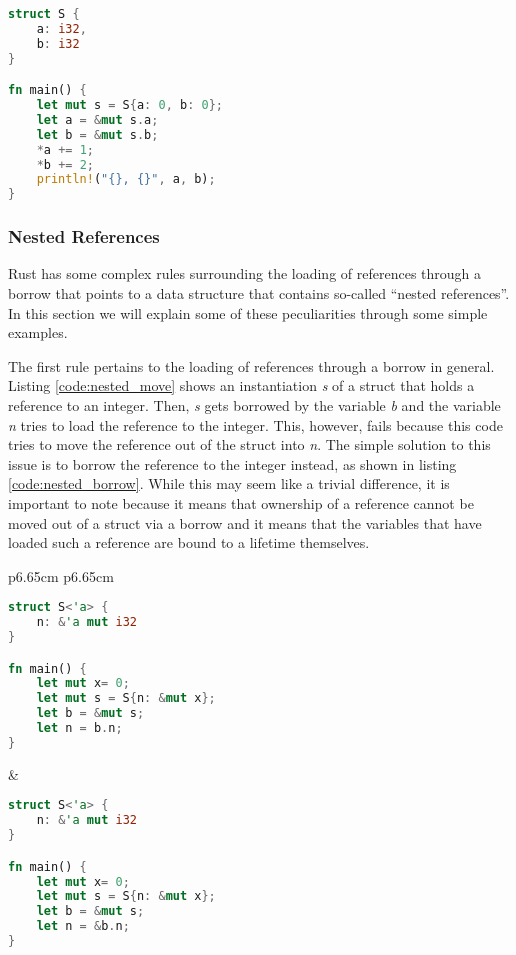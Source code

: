 \begin{lstlisting}[language=Rust,frame=single,caption=Borrowing struct fields,label=code:struct_semantics]
struct S {
    a: i32,
    b: i32
}

fn main() {
    let mut s = S{a: 0, b: 0};
    let a = &mut s.a;
    let b = &mut s.b;
    *a += 1;
    *b += 2;
    println!("{}, {}", a, b);
}
\end{lstlisting}

\subsubsection{Nested References}
Rust has some complex rules surrounding the loading of references through a borrow that points to a data structure that contains so-called ``nested references''.
In this section we will explain some of these peculiarities through some simple examples.

The first rule pertains to the loading of references through a borrow in general.
Listing \ref{code:nested_move} shows an instantiation \textit{s} of a struct that holds a reference to an integer.
Then, \textit{s} gets borrowed by the variable \textit{b} and the variable \textit{n} tries to load the reference to the integer.
This, however, fails because this code tries to move the reference out of the struct into \textit{n}.
The simple solution to this issue is to borrow the reference to the integer instead, as shown in listing \ref{code:nested_borrow}.
While this may seem like a trivial difference, it is important to note because it means that ownership of a reference cannot be moved out of a struct via a borrow and it means that the variables that have loaded such a reference are bound to a lifetime themselves.
\begin{tabular}{p{6.65cm} p{6.65cm}}
    \begin{lstlisting}[language=Rust,frame=single,caption=Move reference,label=code:nested_move]
struct S<'a> {
    n: &'a mut i32
}

fn main() {
    let mut x= 0;
    let mut s = S{n: &mut x};
    let b = &mut s;
    let n = b.n;
}
    \end{lstlisting}

    &

    \begin{lstlisting}[language=Rust,frame=single,caption=Borrow reference,label=code:nested_borrow]
struct S<'a> {
    n: &'a mut i32
}

fn main() {
    let mut x= 0;
    let mut s = S{n: &mut x};
    let b = &mut s;
    let n = &b.n;
}
    \end{lstlisting}
\end{tabular}

